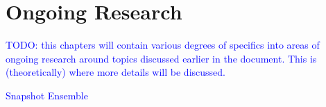 \chapter{Ongoing Research}

\textcolor{blue}{TODO: this chapters will contain various degrees of specifics into areas of ongoing research around topics discussed earlier in the document. This is (theoretically) where more details will be discussed.}

\textcolor{blue}{Snapshot Ensemble~\cite{huang2017snapshot}}







